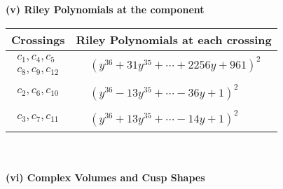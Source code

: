 \documentclass[1p]{elsarticle_modified}
\theoremstyle{definition}
\begin{document}
\newpage\renewcommand{\arraystretch}{1}
\flushleft \textbf{(v) Riley Polynomials at the component}\newline \\
\begin{tabular}{m{50pt}|m{274pt}}
Crossings & \hspace{64pt}Riley Polynomials at each crossing \\
\hline $$\begin{aligned}c_{1},c_{4},c_{5}\\c_{8},c_{9},c_{12}\end{aligned}$$&$\begin{aligned}
&(y^{36}+31 y^{35}+\cdots+2256 y+961)^{2}
\end{aligned}$\\
\hline $$\begin{aligned}c_{2},c_{6},c_{10}\end{aligned}$$&$\begin{aligned}
&(y^{36}-13 y^{35}+\cdots-36 y+1)^{2}
\end{aligned}$\\
\hline $$\begin{aligned}c_{3},c_{7},c_{11}\end{aligned}$$&$\begin{aligned}
&(y^{36}+13 y^{35}+\cdots-14 y+1)^{2}
\end{aligned}$\\
\hline
\end{tabular}\\~\\
\newpage\flushleft \textbf{(vi) Complex Volumes and Cusp Shapes}
\end{document}

